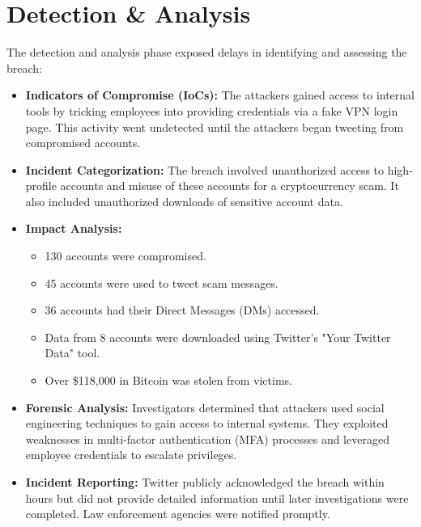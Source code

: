 \documentclass[11pt]{book}
\begin{document}
\section{Detection \& Analysis}
The detection and analysis phase exposed delays in identifying and assessing the breach:
\begin{itemize}
    \item \textbf{Indicators of Compromise (IoCs):} The attackers gained access to internal tools by tricking employees into providing credentials via a fake VPN login page. This activity went undetected until the attackers began tweeting from compromised accounts.
    \item \textbf{Incident Categorization:} The breach involved unauthorized access to high-profile accounts and misuse of these accounts for a cryptocurrency scam. It also included unauthorized downloads of sensitive account data.
    \item \textbf{Impact Analysis:}
    \begin{itemize}
        \item 130 accounts were compromised.
        \item 45 accounts were used to tweet scam messages.
        \item 36 accounts had their Direct Messages (DMs) accessed.
        \item Data from 8 accounts were downloaded using Twitter's "Your Twitter Data" tool.
        \item Over \$118,000 in Bitcoin was stolen from victims.
    \end{itemize}
    \item \textbf{Forensic Analysis:} Investigators determined that attackers used social engineering techniques to gain access to internal systems. They exploited weaknesses in multi-factor authentication (MFA) processes and leveraged employee credentials to escalate privileges.
    \item \textbf{Incident Reporting:} Twitter publicly acknowledged the breach within hours but did not provide detailed information until later investigations were completed. Law enforcement agencies were notified promptly.
\end{itemize}
\end{document}
